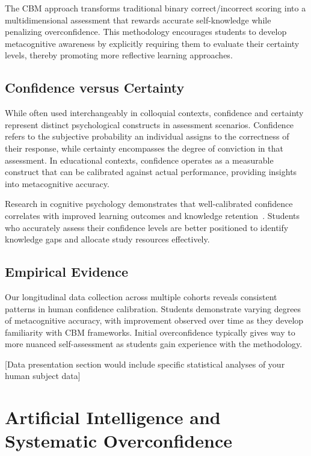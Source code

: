 \documentclass[sigconf]{acmart}
\begin{document}
The CBM approach transforms traditional binary correct/incorrect scoring into a multidimensional assessment that rewards accurate self-knowledge while penalizing overconfidence. This methodology encourages students to develop metacognitive awareness by explicitly requiring them to evaluate their certainty levels, thereby promoting more reflective learning approaches.

\subsection{Confidence versus Certainty}

While often used interchangeably in colloquial contexts, confidence and certainty represent distinct psychological constructs in assessment scenarios. Confidence refers to the subjective probability an individual assigns to the correctness of their response, while certainty encompasses the degree of conviction in that assessment. In educational contexts, confidence operates as a measurable construct that can be calibrated against actual performance, providing insights into metacognitive accuracy.

Research in cognitive psychology demonstrates that well-calibrated confidence correlates with improved learning outcomes and knowledge retention~\cite{dunlosky2011four}. Students who accurately assess their confidence levels are better positioned to identify knowledge gaps and allocate study resources effectively.

\subsection{Empirical Evidence}

Our longitudinal data collection across multiple cohorts reveals consistent patterns in human confidence calibration. Students demonstrate varying degrees of metacognitive accuracy, with improvement observed over time as they develop familiarity with CBM frameworks. Initial overconfidence typically gives way to more nuanced self-assessment as students gain experience with the methodology.

[Data presentation section would include specific statistical analyses of your human subject data]

\section{Artificial Intelligence and Systematic Overconfidence}
\end{document}
